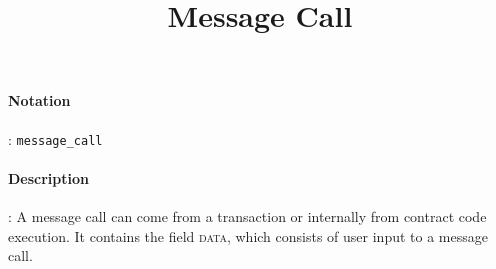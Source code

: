 \documentclass[10pt,a4paper,oneside]{scrartcl}
\author{}
\title{Message Call}
\date{}
\begin{document}
\maketitle
\paragraph{Notation}: \texttt{message\_call}
\paragraph{Description}: A message call can come from a transaction or internally from contract code execution. It contains the field \textsc{data}, which consists of user input to a message call.
\end{document}
